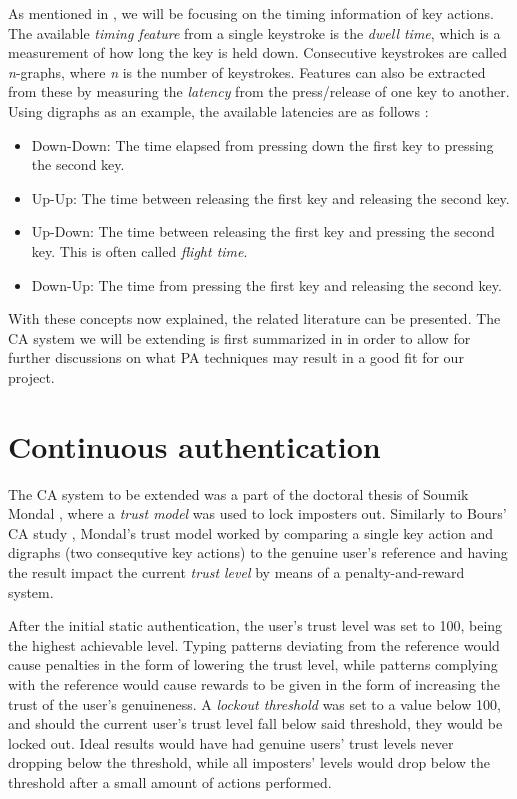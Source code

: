 \documentclass[informationsecurity]{gucmasterproject}
\begin{document}
As mentioned in , we will be focusing on the timing information of key actions.
The available \textit{timing feature} from a single keystroke is the \textit{dwell time}, which is a measurement of how long the key is held down.
Consecutive keystrokes are called \textit{n}-graphs, where \textit{n} is the number of keystrokes.
Features can also be extracted from these by measuring the \textit{latency} from the press/release of one key to another.
Using digraphs as an example, the available latencies are as follows \cite{mondal}:
\begin{itemize}
    \item Down-Down: The time elapsed from pressing down the first key to pressing the second key.
    \item Up-Up: The time between releasing the first key and releasing the second key.
    \item Up-Down: The time between releasing the first key and pressing the second key. This is often called \textit{flight time}.
    \item Down-Up: The time from pressing the first key and releasing the second key.
\end{itemize}

With these concepts now explained, the related literature can be presented.
The CA system we will be extending is first summarized in  in order to allow for further discussions on what PA techniques may result in a good fit for our project.

\section{Continuous authentication}
\label{sec:related-CA}
The CA system to be extended was a part of the doctoral thesis of Soumik Mondal \cite{mondal}, where a \textit{trust model} was used to lock imposters out.
Similarly to Bours' CA study \cite{BOURS201236}, Mondal's trust model worked by comparing a single key action and digraphs (two consequtive key actions) to the genuine user's reference and having the result impact the current \textit{trust level} by means of a penalty-and-reward system.

After the initial static authentication, the user's trust level was set to 100, being the highest achievable level.
Typing patterns deviating from the reference would cause penalties in the form of lowering the trust level, while patterns complying with the reference would cause rewards to be given in the form of increasing the trust of the user's genuineness.
A \textit{lockout threshold} was set to a value below 100, and should the current user's trust level fall below said threshold, they would be locked out.
Ideal results would have had genuine users' trust levels never dropping below the threshold, while all imposters' levels would drop below the threshold after a small amount of actions performed.
\end{document}
